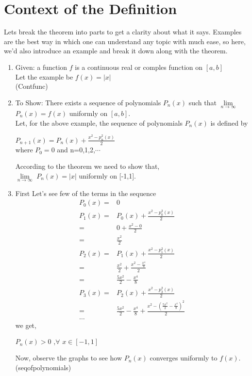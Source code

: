 \documentclass[12pt,a4paper]{article}
\begin{document}
\section{Context of the Definition}
Lets break the theorem into parts to get a clarity about what it says. Examples are the best way in which one can understand any topic with much ease, so here, we'd also introduce an example and break it down along with the theorem.\\
\begin{enumerate}
	\item Given: a function $f$ is a continuous real or comples function on $[a,b]$\\
	        Let the example be $f(x)=|x|$ \\
	        (Contfunc)
	\item To Show: There exists a sequence of polynomials $P_n(x)$ such that $\lim\limits_{n\to \infty}$ $ P_n(x)=f(x)$ uniformly on $[a,b]$.\\
	        Let, for the above example, the sequence of polynomials $P_n(x)$ is defined by 
	        \begin{center}
	        	$P_{n+1}(x) = P_n(x) + \frac{x^2 - p_{n}^2(x)}{2}$\\
	        	where $P_0 =0 $ and n=0,1,2,$\cdots$
	        	\end{center}
       According to the theorem we need to show that,\\
        $\lim\limits_{n\to \infty}$ $ P_n(x)=|x|$  uniformly on [-1,1].
	\item First Let's see few of the terms in the sequence
 \begin{align*} 
P_0(x) =& 0\\
P_1(x) =&  P_0(x) + \frac{x^2 - p_{0}^2(x)}{2}\\
=& 0 + \frac{x^2 - 0}{2}\\
=& \frac{x^2}{2} \\
P_2(x) =& P_1(x) + \frac{x^2 - p_{1}^2(x)}{2} \\
 =& \frac{x^2}{2} + \frac{x^2 - \frac{x^4}{4}}{2}\\
=& \frac{5x^2}{2} - \frac{x^4}{8} \\
P_3(x) =& P_2(x) + \frac{x^2 - p_{2}^2(x)}{2} \\
=&\frac{5x^2}{2} - \frac{x^4}{8}  + \frac{x^2 - (\frac{5x^2}{2} - \frac{x^4}{8})^2}{2}\\
\ldots
\end{align*} 
we get,
\begin{center}
	$P_n(x)>0 $ ,$\forall$ $x \in [-1,1]$\\
\end{center}
Now, observe the graphs to see how $P_n(x)$ converges uniformly to $f(x)$.
(seqofpolynomials)
\end{enumerate}
\end{document}
